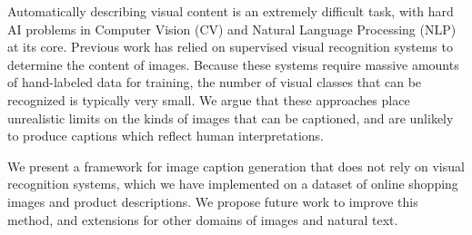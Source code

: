 Automatically describing visual content is an extremely difficult task, with hard AI problems in Computer Vision (CV) and Natural Language Processing (NLP)
 at its core. Previous work has relied on supervised visual recognition systems
 to determine the content of images. Because these systems require massive
 amounts of hand-labeled data for training, the number of visual classes that
 can be recognized is typically very small. We
 argue that these approaches place unrealistic limits on the kinds of images
 that can be captioned, and are unlikely to produce captions which reflect human
 interpretations.
 
 We present a framework for image caption generation that does not rely on
 visual recognition systems, which we have implemented on a dataset of online
 shopping images and product descriptions. We propose future work to improve
 this method, and extensions for other domains of images and natural text.

